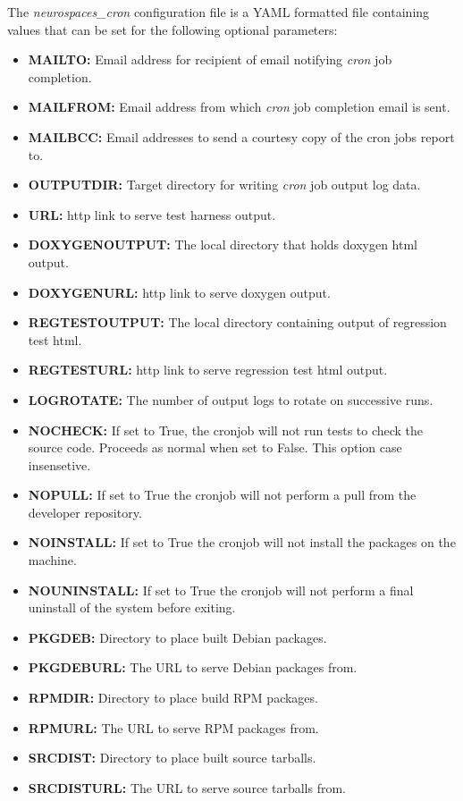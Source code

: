 \documentclass[12pt]{article}
\begin{document}
The  {\it neurospaces\_cron} configuration file is a YAML formatted file containing values that can be set for the following optional parameters:
\begin{itemize}
   \item[]{\bf MAILTO:} Email address for recipient of email notifying {\it cron} job completion.
   \item[]{\bf MAILFROM:} Email address from which {\it cron} job completion email is sent.
   \item[]{\bf MAILBCC:} Email addresses to send a courtesy copy of the cron jobs report to.  
   \item[]{\bf OUTPUTDIR:} Target directory for writing {\it cron} job output log data.
   \item[]{\bf URL:} http link to serve test harness output.
   \item[]{\bf DOXYGENOUTPUT:} The local directory that holds doxygen html output.
   \item[]{\bf DOXYGENURL:} http link to serve doxygen output.
   \item[]{\bf REGTESTOUTPUT:} The local directory containing output of regression test html.
   \item[]{\bf REGTESTURL:} http link to serve regression test html output.
   \item[]{\bf LOGROTATE:} The number of output logs to rotate on successive runs.   
   \item[]{\bf NOCHECK:} If set to True, the cronjob will not run tests to check the source code. Proceeds as normal when set to False. This option case insensetive. 
   \item[]{\bf NOPULL:} If set to True the cronjob will not perform a pull from the developer repository.
   \item[]{\bf NOINSTALL:} If set to True the cronjob will not install the packages on the machine.
   \item[]{\bf NOUNINSTALL:} If set to True the cronjob will not perform a final uninstall of the system before exiting.
   \item[]{\bf PKGDEB:} Directory to place built Debian packages.
   \item[]{\bf PKGDEBURL:} The URL to serve Debian packages from.
   \item[]{\bf RPMDIR:} Directory to place build RPM packages.
   \item[]{\bf RPMURL:} The URL to serve RPM packages from.
   \item[]{\bf SRCDIST:} Directory to place built source tarballs.
   \item[]{\bf SRCDISTURL:} The URL to serve source tarballs from.
\end{itemize}
\end{document}
